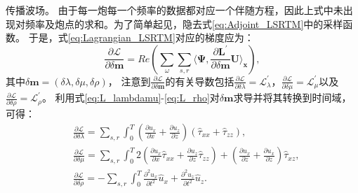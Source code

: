 传播波场。
由于每一炮每一个频率的数据都对应一个伴随方程，因此上式中未出现对频率及炮点的求和。为了简单起见，隐去式\eqref{eq:Adjoint_LSRTM}中的采样函数。
于是，式\eqref{eq:Lagrangian_LSRTM}对应的梯度应为：
\begin{equation}
    \frac{\partial\mathcal{L}}{\partial \delta\mathbf{m}}=Re\left(\sum_{\omega}\sum_{s,r}
	\langle\bm\Psi,\frac{\partial
		\mathbf{L}^{'}}{\partial\delta\mathbf{m}}\mathbf{U}\rangle_{\mathbf{x}}\right),
    \label{eq:Gradient_LSRTM}
\end{equation}
其中$\delta\mathbf{m}=(\delta\lambda, \delta\mu,\delta\rho)$，
注意到$\frac{\partial\mathcal{L}}{\partial \delta\mathbf{m}}$的有关导数包括$\frac{\partial\mathcal{L}}{\partial 
\delta\lambda}=\mathcal{L}^{'}_{\lambda}$，$\frac{\partial\mathcal{L}}{\partial\delta\mu}=\mathcal{L}^{'}_{\mu}$以及
$\frac{\partial\mathcal{L}}{\partial\delta\rho}=\mathcal{L}^{'}_{\rho}$。
利用式\eqref{eq:L_lambdamu}-\eqref{eq:L_rho}对$\delta\mathbf{m}$求导并将其转换到时间域，
可得：
\begin{equation}
\begin{split}
   & \frac{\partial\mathcal{L}}{\partial \delta\lambda}=\sum_{s,r}\int^T_{0}
	(\frac{\partial u_x}{\partial x}+\frac{\partial u_z}{\partial z})(\hat{\tau}_{xx}+\hat{\tau}_{zz}),\\
   & \frac{\partial\mathcal{L}}{\partial \delta\mu}=\sum_{s,r}\int^T_{0}
	2(\frac{\partial u_x}{\partial x}\hat{\tau}_{xx}+\frac{\partial u_z}{\partial z}\hat{\tau}_{zz})+
	(\frac{\partial u_x}{\partial z}+\frac{\partial u_x}{\partial z})\hat{\tau}_{xz},\\
   & \frac{\partial\mathcal{L}}{\partial \delta\rho}=-\sum_{s,r}\int^T_{0}
   \frac{\partial^2 u_x}{\partial t^2}\hat{u}_x+\frac{\partial^2 u_z}{\partial t^2}\hat{u}_{z}.
    \label{eq:Gradient_lambdamurho_LSRTM}
\end{split}
\end{equation}

